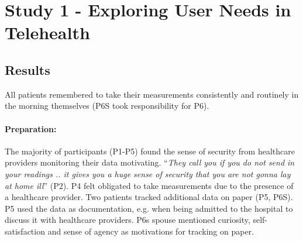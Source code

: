 \section{Study 1 - Exploring User Needs in Telehealth}
\subsection{Results}
All patients remembered to take their measurements consistently and routinely in the morning themselves (P6S took responsibility for P6). 

\paragraph{Preparation:} 
The majority of participants (P1-P5) found the sense of security from healthcare providers monitoring their data motivating. “\textit{They call you if you do not send in your readings .. it gives you a huge sense of security that you are not gonna lay at home ill}” (P2). P4 felt obligated to take measurements due to the presence of a healthcare provider. Two patients tracked additional data on paper (P5, P6S). P5 used the data as documentation, e.g. when being admitted to the hospital to discuss it with healthcare providers. P6s spouse mentioned curiosity, self-satisfaction and sense of agency as motivations for tracking on paper. 

